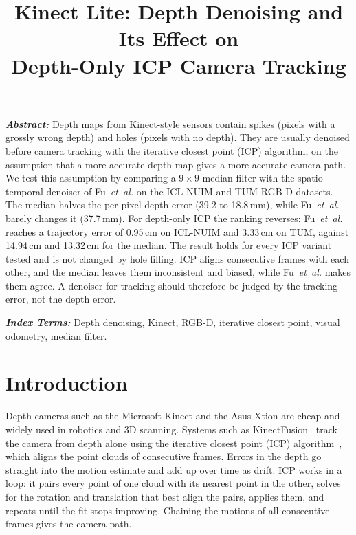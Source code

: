 \documentclass[conference]{IEEEtran}
\newcommand{\fu}{Fu~\emph{et~al.}}
\begin{document}
\title{Kinect Lite: Depth Denoising and Its Effect on\\ Depth-Only ICP Camera Tracking}

\author{%
}


\maketitle

\noindent\textbf{\textit{Abstract:}} Depth maps from Kinect-style sensors contain spikes
(pixels with a grossly wrong depth) and holes (pixels with no depth). They are usually denoised before
camera tracking with the iterative closest point (ICP) algorithm, on the
assumption that a more accurate depth map gives a more accurate camera path. We
test this assumption by comparing a $9\times9$ median filter with the
spatio-temporal denoiser of \fu{} on the ICL-NUIM and TUM RGB-D datasets. The
median halves the per-pixel depth error (39.2 to 18.8\,mm), while \fu{} barely
changes it (37.7\,mm). For depth-only ICP the ranking reverses: \fu{} reaches a
trajectory error of 0.95\,cm on ICL-NUIM and 3.33\,cm on TUM, against
14.94\,cm and 13.32\,cm for the median. The result holds for every ICP variant
tested and is not changed by hole filling. ICP aligns consecutive frames with
each other, and the median leaves them inconsistent and biased, while \fu{}
makes them agree. A denoiser for tracking should therefore be judged by the
tracking error, not the depth error.

\vspace{0.5\baselineskip}
\noindent\textbf{\textit{Index Terms:}} Depth denoising, Kinect, RGB-D,
iterative closest point, visual odometry, median filter.
\vspace{0.3\baselineskip}

\section{Introduction}

Depth cameras such as the Microsoft Kinect and the Asus Xtion are cheap and
widely used in robotics and 3D scanning. Systems such as
KinectFusion~\cite{newcombe2011kinectfusion} track the camera from depth alone
using the iterative closest point (ICP) algorithm~\cite{besl1992method,chen1992object},
which aligns the point clouds of consecutive frames. Errors in the depth go
straight into the motion estimate and add up over time as drift. ICP works in a loop: it pairs every point of one cloud with its nearest point
in the other, solves for the rotation and translation that best align the
pairs, applies them, and repeats until the fit stops improving. Chaining the
motions of all consecutive frames gives the camera path.
\end{document}
